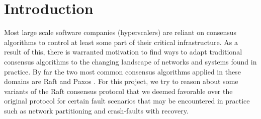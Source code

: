 \section{Introduction}
\label{sec:introduction}

Most large scale software companies (hyperscalers) are reliant on consensus algorithms to control at least some part of their critical infrastructure.
As a result of this, there is warranted motivation to find ways to adapt traditional consensus algorithms to the changing landscape of networks and systems found in practice.
By far the two most common consensus algorithms applied in these domains are Raft \cite{10.5555/2643634.2643666} and Paxos \cite{lamport_1998}.
For this project, we  try to reason about some variants of the Raft consensus protocol that we deemed favorable over the original protocol for certain fault scenarios that may be encountered in practice such as network partitioning and crash-faults with recovery.






